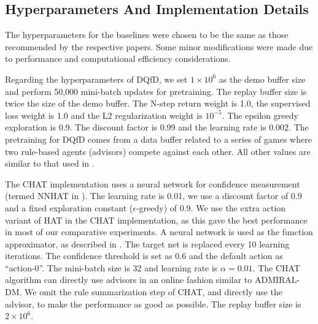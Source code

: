 \documentclass[jair, twoside,11pt,theapa]{article}
\begin{document}


\subsection{Hyperparameters And Implementation Details}

The hyperparameters for the baselines were chosen to be the same as those recommended by the respective papers. Some minor modifications were made due to performance and computational efficiency considerations. 

Regarding the hyperparameters of DQfD, we set $1 \times 10^6$ as the demo buffer size and perform 50,000 mini-batch updates for pretraining. The replay buffer size is twice the size of the demo buffer. The N-step return weight is 1.0, the supervised loss weight is 1.0 and the L2 regularization weight is $10^{-5}$. The epsilon greedy exploration is 0.9. The discount factor is 0.99 and the learning rate is 0.002. 
The pretraining for DQfD comes from a data buffer related to a series of games where two rule-based agents (advisors) compete against each other.  All other values are similar to that used in \cite{hester2018deep}.

The CHAT \citep{wang2017improving} implementation uses a neural network for confidence measurement (termed NNHAT in \cite{wang2017improving}). The learning rate is 0.01, we use a discount factor of 0.9 and a fixed exploration constant ($\epsilon$-greedy) of 0.9. We use the extra action variant of HAT \citep{taylor2011integrating} in the CHAT implementation, as this gave the best performance in most of our comparative experiments. A neural network is used as the function approximator, as described in \cite{mnih2015human}. The target net is replaced every 10 learning iterations. The confidence threshold is set as 0.6 and the default action as ``action-0''. The mini-batch size is 32 and learning rate is $\alpha = 0.01$. The CHAT algorithm can directly use advisors in an online fashion similar to ADMIRAL-DM. We omit the rule summarization step of CHAT, and directly use the advisor, to make the performance as good as possible.  The replay buffer size is $2 \times 10^6$. 
\end{document}
